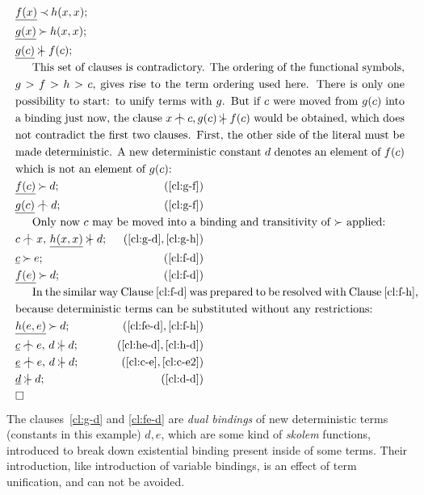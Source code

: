 \begin{example} \label {famous}
\begin{eqnarray}
\label{cl:f-h}  &\underline{f(x)}\Incl h(x,x); \\
\label{cl:g-h}  &\underline{g(x)}\Cont h(x,x);\\
\label{cl:g-f}  &\underline{g(c)}\notCont f(c);\\
\noalign{This set of clauses is contradictory.  The ordering of 
the functional symbols, $g>f>h>c$, gives rise to the term ordering used here.
There is only one possibility to start: to unify terms with
$g$. But if $c$ were moved from $g(c)$ into a binding just now, the clause
\(x\notInt c, g(c)\notCont f(c)\) would be obtained, which does not
contradict the first two clauses.  First, the other side of the literal
must be made deterministic. A new deterministic constant $d$ denotes an element
of $f(c)$ which is not an element of $g(c)$:}
\label{cl:f-d}  &\underline{f(c)}\Cont d; &  (\ref {cl:g-f})\\
\label{cl:g-d}  &\underline{g(c)}\notInt d; &  (\ref {cl:g-f})\\
\noalign{Only now $c$ may be moved into a binding and transitivity of 
$\Cont$ applied:}
\label{cl:h-d}  & c\notInt x,\,\underline{h(x,x)}\notCont d; &  (\ref{cl:g-d},\ref{cl:g-h})\\
\label{cl:c-e}   &\underline c\Cont e; &  (\ref {cl:f-d})\\
\label{cl:fe-d}   &\underline{f(e)}\Cont d; &  (\ref {cl:f-d})\\
\noalign{In the similar way Clause~\ref {cl:f-d} was prepared to be resolved
with Clause~\ref {cl:f-h}, because deterministic terms can be substituted
without any restrictions:}
\label{cl:he-d}  &\underline{h(e,e)}\Cont d; &  (\ref {cl:fe-d},\ref{cl:f-h})\\
\label{cl:c-e2}  & \underline c\notInt e,\, d\notCont d; &  (\ref {cl:he-d},\ref{cl:h-d})\\
\label{cl:d-d}   & \underline e\notInt e,\,d\notCont d; &  (\ref {cl:c-e},\ref{cl:c-e2})\\
&\underline{d}\notCont d; &  (\ref {cl:d-d})\\
& \Box
\end{eqnarray}
The clauses~\ref {cl:g-d} and \ref{cl:fe-d} are {\em dual bindings} of new
deterministic terms (constants in this example) $d,e$, which are some kind of
{\em skolem} functions, introduced to break down existential binding present
inside of some terms.  Their introduction, like introduction of variable
bindings, is an effect of term unification, and can not be avoided.
\end{example}

